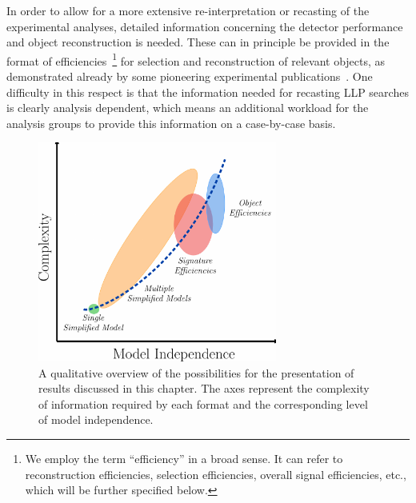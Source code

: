 In order to allow for a more extensive re-interpretation or recasting of
the experimental analyses, detailed information concerning the detector
performance and object reconstruction is needed.
These can in principle be provided in the format of efficiencies~\footnote{We
employ the term ``efficiency'' in a broad sense. It can refer to reconstruction
efficiencies, selection efficiencies, overall signal efficiencies, etc., which will be further specified below.}
for selection and reconstruction of relevant objects, as demonstrated
already by some pioneering experimental publications~\cite{Khachatryan:2015lla,Aaboud:2017iio}.
One difficulty in this respect is that the information needed for recasting LLP searches is clearly
analysis dependent, which means an additional workload for the analysis groups to provide this information
on a case-by-case basis.

\begin{figure}[t]
\begin{center}
\includegraphics[width=0.7\textwidth,angle=0]{ch5-figures/LLP_interpretationsB.pdf}
\end{center}
\caption{A qualitative overview of the possibilities
for the presentation of results discussed in this chapter.
The axes represent the complexity of information required by each
format and the corresponding level of model independence.}
\label{fig:ch5-complexity-vs-modelindependence}
\end{figure}

